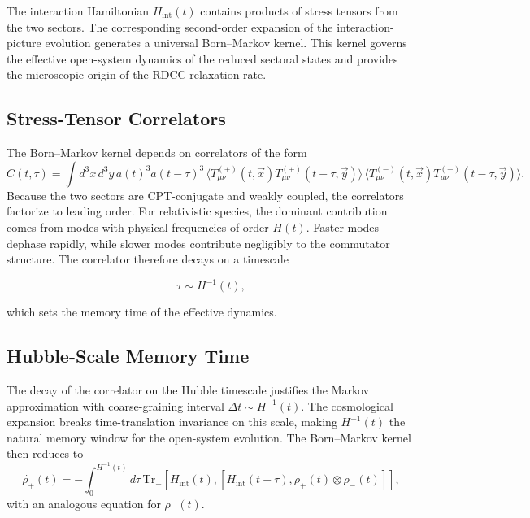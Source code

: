 \documentclass[11pt,a4paper]{article}
\newcommand{\rplus}{\rho_+}
\newcommand{\rminus}{\rho_-}
\newcommand{\Tplus}{T^{(+)}_{\mu\nu}}
\newcommand{\Tminus}{T^{(-)}_{\mu\nu}}
\newcommand{\Hint}{H_{\mathrm{int}}}
\newcommand{\Trm}{\mathrm{Tr}}
\begin{document}
The interaction Hamiltonian \(\Hint(t)\) contains products of stress tensors from
the two sectors. The corresponding second-order expansion of the interaction-picture
evolution generates a universal Born--Markov kernel. This kernel governs the
effective open-system dynamics of the reduced sectoral states and provides the
microscopic origin of the RDCC relaxation rate.

\subsection{Stress-Tensor Correlators}

The Born--Markov kernel depends on correlators of the form
\begin{equation}
C(t,\tau)
    = \int d^{3}x\, d^{3}y\,
      a(t)^{3} a(t-\tau)^{3}\,
      \langle \Tplus(t,\vec{x}) \Tplus(t-\tau,\vec{y}) \rangle\,
      \langle \Tminus(t,\vec{x}) \Tminus(t-\tau,\vec{y}) \rangle.
\end{equation}
Because the two sectors are CPT-conjugate and weakly coupled, the correlators
factorize to leading order. For relativistic species, the dominant contribution
comes from modes with physical frequencies of order \(H(t)\). Faster modes
dephase rapidly, while slower modes contribute negligibly to the commutator
structure. The correlator therefore decays on a timescale


\[
\tau \sim H^{-1}(t),
\]


which sets the memory time of the effective dynamics.

\subsection{Hubble-Scale Memory Time}

The decay of the correlator on the Hubble timescale justifies the Markov
approximation with coarse-graining interval \(\Delta t \sim H^{-1}(t)\). The
cosmological expansion breaks time-translation invariance on this scale, making
\(H^{-1}(t)\) the natural memory window for the open-system evolution. The
Born--Markov kernel then reduces to
\begin{equation}
\dot{\rplus}(t)
    = -\int_{0}^{H^{-1}(t)}
      d\tau\,
      \Trm_{-}
      \left[
          \Hint(t),
          \left[
              \Hint(t-\tau),
              \rplus(t) \otimes \rminus(t)
          \right]
      \right],
\end{equation}
with an analogous equation for \(\rminus(t)\).
\end{document}
